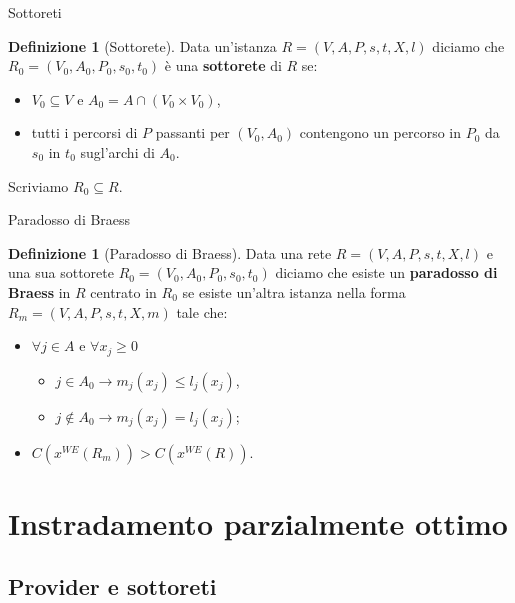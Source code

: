 \documentclass{beamer}
\newcounter{counter1}
\theoremstyle{plain}
\theoremstyle{definition}
\newtheorem{mydef}[counter1]{Definizione}
\theoremstyle{remark}
\newcommand{\pa}[1]{\left(#1\right)}
\begin{document}
\begin{frame}{Sottoreti}
  \begin{mydef}[Sottorete]
    Data un'istanza $R=(V,A,P,s,t,X,l)$ diciamo che
    $R_0=(V_0,A_0,P_0,s_0,t_0)$ è una \textbf{sottorete} di $R$ se:
    \begin{itemize}
    \item $V_0 \subseteq V$ e $A_0 = A \cap \pa{V_0\times V_0}$,
    \item tutti i percorsi di $P$ passanti per $\pa{V_0,A_0}$
      contengono un percorso in $P_0$ da $s_0$ in $t_0$ sugl'archi di
      $A_0$.
    \end{itemize}
    Scriviamo $R_0\subseteq R$.
  \end{mydef}
\end{frame}

\begin{frame}{Paradosso di Braess}
  \begin{mydef}[Paradosso di Braess]
    Data una rete $R=(V,A,P,s,t,X,l)$ e una sua sottorete
    $R_0=(V_0,A_0,P_0,s_0,t_0)$ diciamo che esiste un
    \textbf{paradosso di Braess} in $R$ centrato in $R_0$ se esiste
    un'altra istanza nella forma $R_m=(V,A,P,s,t,X,m)$ tale che:
    \begin{itemize}
    \item $\forall j\in A$ e $\forall x_j \ge0$
      \begin{itemize}
      \item $j \in A_0 \longrightarrow m_j(x_j) \le l_j(x_j)$,
      \item $j \not\in A_0\longrightarrow m_j(x_j) = l_j(x_j)$;
      \end{itemize}
    \item $C\pa{x^{WE}\pa{R_m}} > C\pa{x^{WE}\pa{R}}$.
    \end{itemize}
  \end{mydef}
\end{frame}

\section{Instradamento parzialmente ottimo}

\subsection{Provider e sottoreti}
\end{document}
